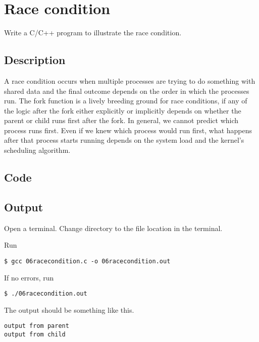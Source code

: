 \chapter{Race condition}

Write a C/C++ program to illustrate the race condition.

\section{Description}

A race condition occurs when multiple processes are trying to do something with shared data and the final outcome depends on the order in which the processes run. The fork function is a lively breeding ground for race conditions, if any of the logic after the fork either explicitly or implicitly depends on whether the parent or child runs first after the fork. In general, we cannot predict which process runs first. Even if we knew which process would run first, what happens after that process starts running depends on the system load and the kernel's scheduling algorithm.

\section{Code}



\section{Output}

Open a terminal. Change directory to the file location in the terminal.

Run
\begin{lstlisting}[style=shell-command]
$ gcc 06racecondition.c -o 06racecondition.out
\end{lstlisting}

If no errors, run
\begin{lstlisting}[style=shell-command]
$ ./06racecondition.out
\end{lstlisting}

The output should be something like this.
\begin{lstlisting}[style=shell-output]
output from parent
output from child
\end{lstlisting}
